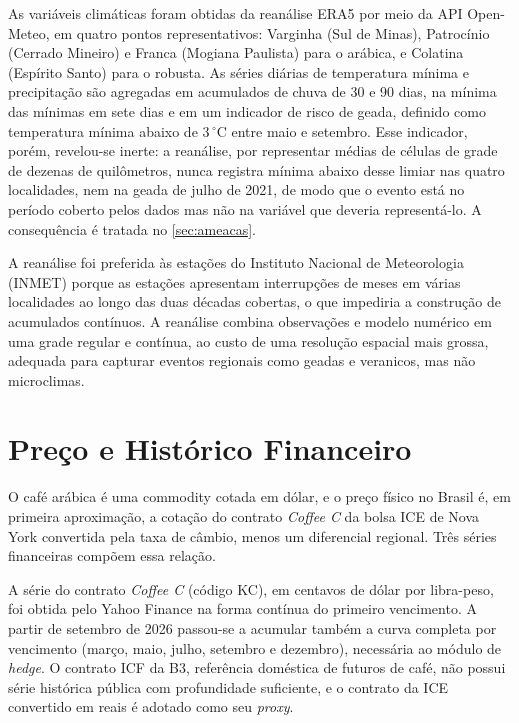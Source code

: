 As variáveis climáticas foram obtidas da reanálise ERA5 por meio da API Open-Meteo, em quatro pontos representativos: Varginha (Sul de Minas), Patrocínio (Cerrado Mineiro) e Franca (Mogiana Paulista) para o arábica, e Colatina (Espírito Santo) para o robusta. As séries diárias de temperatura mínima e precipitação são agregadas em acumulados de chuva de 30 e 90 dias, na mínima das mínimas em sete dias e em um indicador de risco de geada, definido como temperatura mínima abaixo de 3\,$^{\circ}$C entre maio e setembro. Esse indicador, porém, revelou-se inerte: a reanálise, por representar médias de células de grade de dezenas de quilômetros, nunca registra mínima abaixo desse limiar nas quatro localidades, nem na geada de julho de 2021, de modo que o evento está no período coberto pelos dados mas não na variável que deveria representá-lo. A consequência é tratada no \autoref{sec:ameacas}.

A reanálise foi preferida às estações do Instituto Nacional de Meteorologia (INMET) porque as estações apresentam interrupções de meses em várias localidades ao longo das duas décadas cobertas, o que impediria a construção de acumulados contínuos. A reanálise combina observações e modelo numérico em uma grade regular e contínua, ao custo de uma resolução espacial mais grossa, adequada para capturar eventos regionais como geadas e veranicos, mas não microclimas.

\section{Preço e Histórico Financeiro}\label{sec2:fontes-financeiro}

O café arábica é uma commodity cotada em dólar, e o preço físico no Brasil é, em primeira aproximação, a cotação do contrato \textit{Coffee C} da bolsa ICE de Nova York convertida pela taxa de câmbio, menos um diferencial regional. Três séries financeiras compõem essa relação.

A série do contrato \textit{Coffee C} (código KC), em centavos de dólar por libra-peso, foi obtida pelo Yahoo Finance na forma contínua do primeiro vencimento. A partir de setembro de 2026 passou-se a acumular também a curva completa por vencimento (março, maio, julho, setembro e dezembro), necessária ao módulo de \textit{hedge}. O contrato ICF da B3, referência doméstica de futuros de café, não possui série histórica pública com profundidade suficiente, e o contrato da ICE convertido em reais é adotado como seu \textit{proxy}.

